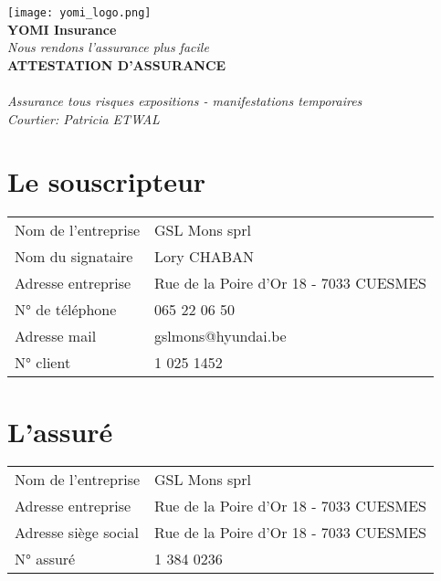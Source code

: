 \documentclass[a4paper,12pt]{article}
\begin{document}
      \begin{center}
        \texttt{[image: yomi\_logo.png]} \\[0.5cm]
        \textbf{\LARGE YOMI Insurance} \\[0.2cm]
        \textit{Nous rendons l'assurance plus facile} \\[0.5cm]
        \textbf{\Large ATTESTATION D'ASSURANCE} \\[0.5cm]
        \colorbox{yomiYellow}{} \\[0.2cm]
        \textit{Assurance tous risques expositions - manifestations temporaires} \\[0.2cm]
        \textit{Courtier: Patricia ETWAL}
      \end{center}
      \section*{Le souscripteur}
      \begin{tabular}{p{4cm} p{8cm}}
        \toprule
        Nom de l'entreprise & GSL Mons sprl \\
        Nom du signataire & Lory CHABAN \\
        Adresse entreprise & Rue de la Poire d'Or 18 - 7033 CUESMES \\
        N° de téléphone & 065 22 06 50 \\
        Adresse mail & gslmons@hyundai.be \\
        N° client & 1 025 1452 \\
        \bottomrule
      \end{tabular}
      \vspace{0.5cm}
      \section*{L'assuré}
      \begin{tabular}{p{4cm} p{8cm}}
        \toprule
        Nom de l'entreprise & GSL Mons sprl \\
        Adresse entreprise & Rue de la Poire d'Or 18 - 7033 CUESMES \\
        Adresse siège social & Rue de la Poire d'Or 18 - 7033 CUESMES \\
        N° assuré & 1 384 0236 \\
        \bottomrule
      \end{tabular}
      \vspace{0.5cm}
\end{document}
